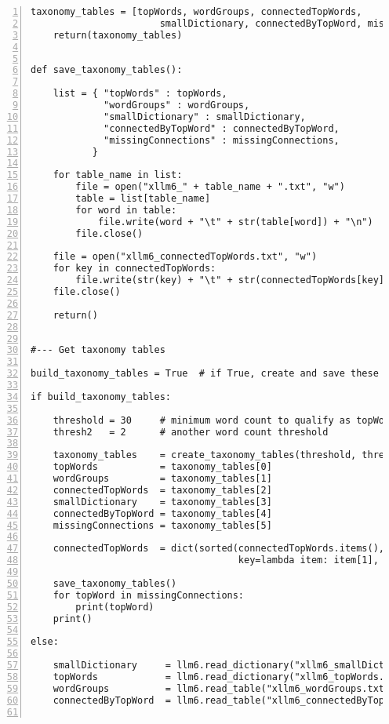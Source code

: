 \documentclass[oneside,10pt]{book}
\begin{document}
\begin{lstlisting}[numbers=left]
    taxonomy_tables = [topWords, wordGroups, connectedTopWords,
                       smallDictionary, connectedByTopWord, missingConnections]
    return(taxonomy_tables)


def save_taxonomy_tables(): 
   
    list = { "topWords" : topWords,
             "wordGroups" : wordGroups,
             "smallDictionary" : smallDictionary,
             "connectedByTopWord" : connectedByTopWord, 
             "missingConnections" : missingConnections,
           }

    for table_name in list:
        file = open("xllm6_" + table_name + ".txt", "w")
        table = list[table_name]
        for word in table:
            file.write(word + "\t" + str(table[word]) + "\n")
        file.close()

    file = open("xllm6_connectedTopWords.txt", "w") 
    for key in connectedTopWords:
        file.write(str(key) + "\t" + str(connectedTopWords[key]) + "\n")
    file.close()

    return()


#--- Get taxonomy tables 

build_taxonomy_tables = True  # if True, create and save these tables locally (slow)

if build_taxonomy_tables:
 
    threshold = 30     # minimum word count to qualify as topWord 
    thresh2   = 2      # another word count threshold             

    taxonomy_tables    = create_taxonomy_tables(threshold, thresh2, ignoreWords, dictionary)
    topWords           = taxonomy_tables[0] 
    wordGroups         = taxonomy_tables[1] 
    connectedTopWords  = taxonomy_tables[2] 
    smallDictionary    = taxonomy_tables[3] 
    connectedByTopWord = taxonomy_tables[4] 
    missingConnections = taxonomy_tables[5]

    connectedTopWords  = dict(sorted(connectedTopWords.items(), 
                                     key=lambda item: item[1], reverse=True))

    save_taxonomy_tables()
    for topWord in missingConnections:
        print(topWord)
    print()

else:

    smallDictionary     = llm6.read_dictionary("xllm6_smallDictionary.txt", path="")
    topWords            = llm6.read_dictionary("xllm6_topWords.txt", path="")
    wordGroups          = llm6.read_table("xllm6_wordGroups.txt", type="hash", path="")
    connectedByTopWord  = llm6.read_table("xllm6_connectedByTopWord.txt", type="hash", path="")
    

\end{lstlisting}
\end{document}

